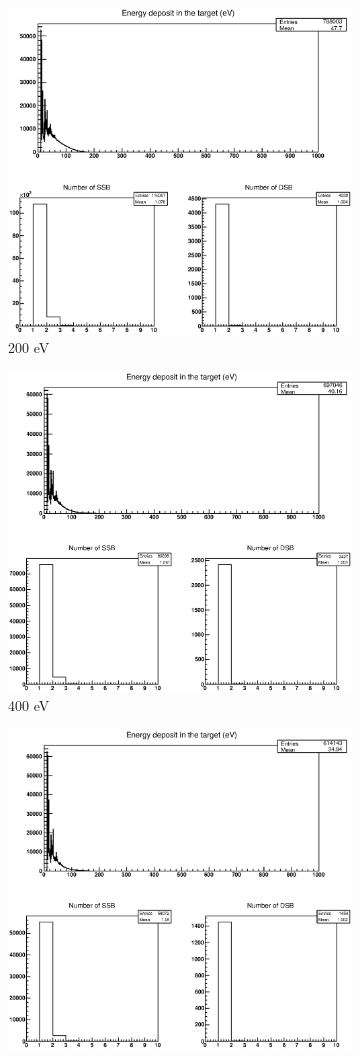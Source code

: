 \begin{figure}
\begin{subfigure}{.5\textwidth}
  \includegraphics[width=.78\linewidth]{./Figures/1fzxe200ev.eps}
  \caption{200 eV}
  \label{fig:sube3}
\end{subfigure}%
\begin{subfigure}{.5\textwidth}
  \centering
  \includegraphics[width=.78\linewidth]{./Figures/1fzxe400ev.eps}
  \caption{400 eV}
  \label{fig:sube4}
\end{subfigure}
\begin{subfigure}{.5\textwidth}
  \centering
  \includegraphics[width=.78\linewidth]{./Figures/1fzxe600ev.eps}

\end{subfigure}
\end{figure}
